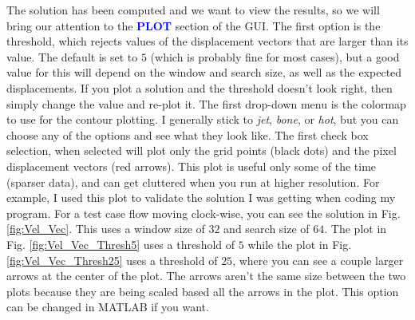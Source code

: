 \documentclass[letterpaper,12pt]{article}
\begin{document}
The solution has been computed and we want to view the results, so we will bring our attention to the \textcolor{blue}{\textbf{PLOT}} section of the GUI.  The first option is the threshold, which rejects values of the displacement vectors that are larger than its value.  The default is set to $5$ (which is probably fine for most cases), but a good value for this will depend on the window and search size, as well as the expected displacements.  If you plot a solution and the threshold doesn't look right, then simply change the value and re-plot it.  The first drop-down menu is the colormap to use for the contour plotting.  I generally stick to \textit{jet}, \textit{bone}, or \textit{hot}, but you can choose any of the options and see what they look like.  The first check box selection, when selected will plot only the grid points (black dots) and the pixel displacement vectors (red arrows).  This plot is useful only some of the time (sparser data), and can get cluttered when you run at higher resolution.  For example, I used this plot to validate the solution I was getting when coding my program.  For a test case flow moving clock-wise, you can see the solution in Fig. \ref{fig:Vel_Vec}.  This uses a window size of $32$ and search size of $64$.  The plot in Fig. \ref{fig:Vel_Vec_Thresh5} uses a threshold of $5$ while the plot in Fig. \ref{fig:Vel_Vec_Thresh25} uses a threshold of $25$, where you can see a couple larger arrows at the center of the plot.  The arrows aren't the same size between the two plots because they are being scaled based all the arrows in the plot.  This option can be changed in MATLAB if you want.
\end{document}
